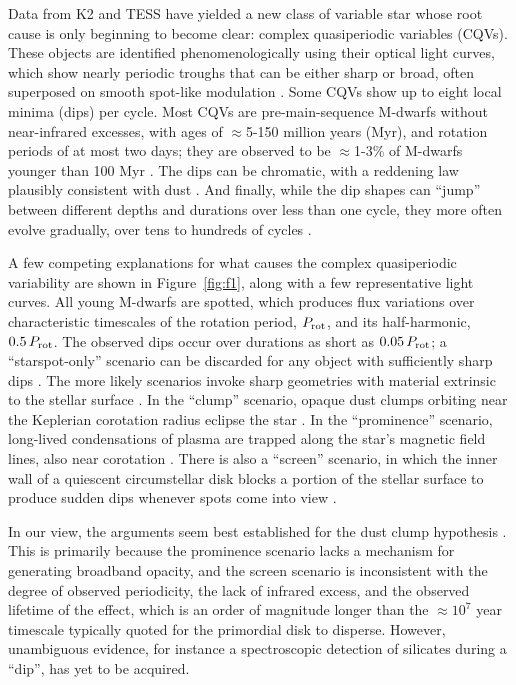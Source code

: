 \documentclass[11pt,twocolumn,tighten]{aastex63}
\begin{document}
Data from K2 and TESS have yielded a new class of variable star whose
root cause is only beginning to become clear: complex quasiperiodic
variables (CQVs).  These objects are identified phenomenologically
using their optical light curves, which show nearly periodic troughs
that can be either sharp or broad, often superposed on smooth
spot-like modulation
\citep{2017AJ....153..152S,2018AJ....155...63S,2019ApJ...876..127Z}.
Some CQVs show up to eight local minima (dips) per cycle.  Most CQVs
are pre-main-sequence M-dwarfs without near-infrared excesses, with
ages of $\approx$5-150 million years (Myr), and rotation periods of at
most two days; they are observed to be $\approx$1-3\% of M-dwarfs
younger than 100 Myr \citep{2016AJ....152..114R,2022AJ....163..144G}.
The dips can be chromatic, with a reddening law plausibly consistent
with dust
\citep{2020AJ....160...86B,2022AJ....163..144G,2023MNRAS.518.2921K}.
And finally, while the dip shapes can ``jump'' between different
depths and durations over less than one cycle, they more often evolve
gradually, over tens to hundreds of cycles
\citep[e.g.][]{2017AJ....153..152S,2022ApJ...925...75P,2023ApJ...945..114P}.

A few competing explanations for what causes the complex quasiperiodic
variability are shown in Figure~\ref{fig:f1}, along with a few
representative light curves.  All young M-dwarfs are spotted, which
produces flux variations over characteristic timescales of the
rotation period, $P_{\rm rot}$, and its half-harmonic, $0.5\,P_{\rm
rot}$.  The observed dips occur over durations as short as
$0.05\,P_{\rm rot}$; a ``starspot-only'' scenario can be discarded for
any object with sufficiently sharp dips
\citep{2017AJ....153..152S,2021MNRAS.500.1366K}.   The more likely
scenarios invoke sharp geometries with material extrinsic to the
stellar surface
\citep[e.g.][]{2017AJ....153..152S,2022AJ....163..144G}.  In the
``clump'' scenario, opaque dust clumps orbiting near the Keplerian
corotation radius eclipse the star
\citep{2017AJ....153..152S,2023MNRAS.518.4734S}.  In the
``prominence'' scenario, long-lived condensations of plasma are
trapped along the star’s magnetic field lines, also near corotation
\citep{2022MNRAS.514.5465W}.  There is also a ``screen'' scenario, in
which the inner wall of a quiescent circumstellar disk blocks a
portion of the stellar surface to produce sudden dips whenever spots
come into view \citep{2019ApJ...876..127Z}.  

In our view, the arguments seem best established for the dust clump
hypothesis \citep{2023MNRAS.518.4734S}.  This is primarily because the
prominence scenario lacks a mechanism for generating broadband
opacity, and the screen scenario is inconsistent with the degree of
observed periodicity, the lack of infrared excess, and the observed
lifetime of the effect, which is an order of magnitude longer than the
$\approx$$10^7$ year timescale typically quoted for the primordial
disk to disperse.  However, unambiguous evidence, for instance a
spectroscopic detection of silicates during a ``dip'', has yet to be
acquired.
\end{document}
